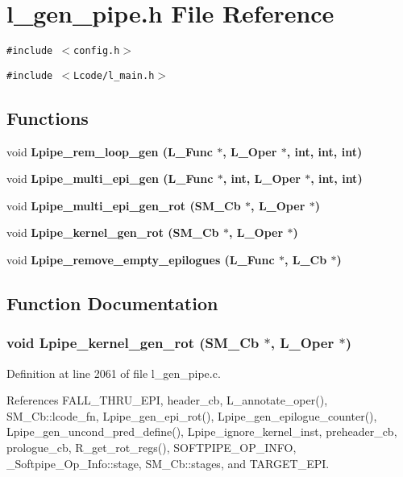 \section{l\_\-gen\_\-pipe.h File Reference}
\label{l__gen__pipe_8h}
{\tt \#include $<$config.h$>$}\par
{\tt \#include $<$Lcode/l\_\-main.h$>$}\par
\subsection*{Functions}
\begin{CompactItemize}
\item 
void \bf{Lpipe\_\-rem\_\-loop\_\-gen} (L\_\-Func $\ast$, L\_\-Oper $\ast$, int, int, int)
\item 
void \bf{Lpipe\_\-multi\_\-epi\_\-gen} (L\_\-Func $\ast$, int, L\_\-Oper $\ast$, int, int)
\item 
void \bf{Lpipe\_\-multi\_\-epi\_\-gen\_\-rot} (\bf{SM\_\-Cb} $\ast$, L\_\-Oper $\ast$)
\item 
void \bf{Lpipe\_\-kernel\_\-gen\_\-rot} (\bf{SM\_\-Cb} $\ast$, L\_\-Oper $\ast$)
\item 
void \bf{Lpipe\_\-remove\_\-empty\_\-epilogues} (L\_\-Func $\ast$, L\_\-Cb $\ast$)
\end{CompactItemize}


\subsection{Function Documentation}
\subsubsection{\setlength{\rightskip}{0pt plus 5cm}void Lpipe\_\-kernel\_\-gen\_\-rot (\bf{SM\_\-Cb} $\ast$, L\_\-Oper $\ast$)}\label{l__gen__pipe_8h_5253f9f10f873086c2794845af160b32}




Definition at line 2061 of file l\_\-gen\_\-pipe.c.

References FALL\_\-THRU\_\-EPI, header\_\-cb, L\_\-annotate\_\-oper(), SM\_\-Cb::lcode\_\-fn, Lpipe\_\-gen\_\-epi\_\-rot(), Lpipe\_\-gen\_\-epilogue\_\-counter(), Lpipe\_\-gen\_\-uncond\_\-pred\_\-define(), Lpipe\_\-ignore\_\-kernel\_\-inst, preheader\_\-cb, prologue\_\-cb, R\_\-get\_\-rot\_\-regs(), SOFTPIPE\_\-OP\_\-INFO, \_\-Softpipe\_\-Op\_\-Info::stage, SM\_\-Cb::stages, and TARGET\_\-EPI.

